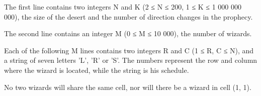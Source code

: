 The first line contains two integers N and K (2 ≤ N ≤ 200, 1 ≤ K ≤ 1 000 000 000), the size of the desert and the number of direction changes in the prophecy.  

   The second line contains an integer M (0 ≤ M ≤ 10 000), the number of wizards.  

   Each of the following M lines contains two integers R and C (1 ≤ R, C ≤ N), and a string of seven letters 'L', 'R' or 'S'. The numbers represent the row and column where the wizard is located, while the string is his schedule.  

   No two wizards will share the same cell, nor will there be a wizard in cell (1, 1).  

\